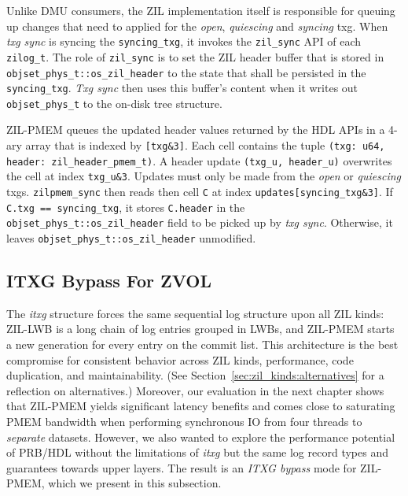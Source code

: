 \documentclass[12pt,a4paper,twoside]{book}
\begin{document}
{\begin{description}
        Unlike DMU consumers, the ZIL implementation itself is responsible for queuing up changes that need to applied for the \textit{open}, \textit{quiescing} and \textit{syncing} txg.
        When \textit{txg sync} is syncing the \lstinline{syncing_txg}, it invokes the \lstinline{zil_sync} API of each \lstinline{zilog_t}.
        The role of \lstinline{zil_sync} is to set the ZIL header buffer that is stored in \lstinline{objset_phys_t::os_zil_header} to the state that shall be persisted in the \lstinline{syncing_txg}.
        \textit{Txg sync} then uses this buffer's content when it writes out \lstinline{objset_phys_t} to the on-disk tree structure.

        ZIL-PMEM queues the updated header values returned by the HDL APIs in a 4-ary array that is indexed by \lstinline{[txg&3]}.
        Each cell contains the tuple \lstinline{(txg: u64, header: zil_header_pmem_t)}.
        A header update \lstinline{(txg_u, header_u)} overwrites the cell at index \lstinline{txg_u&3}.
        Updates must only be made from the \textit{open} or \textit{quiescing} txgs.
        \lstinline{zilpmem_sync} then reads then cell \lstinline{C} at index \lstinline{updates[syncing_txg&3]}.
        If \lstinline{C.txg == syncing_txg}, it stores \lstinline{C.header} in the \lstinline{objset_phys_t::os_zil_header} field to be picked up by \textit{txg sync}.
        Otherwise, it leaves \lstinline{objset_phys_t::os_zil_header} unmodified.

\end{description}

\subsection{ITXG Bypass For ZVOL}\label{sec:itxgbypass}
The \textit{itxg} structure forces the same sequential log structure upon all ZIL kinds:
ZIL-LWB is a long chain of log entries grouped in LWBs, and ZIL-PMEM starts a new generation for every entry on the commit list.
This architecture is the best compromise for consistent behavior across ZIL kinds, performance, code duplication, and maintainability.
(See Section~\ref{sec:zil_kinds:alternatives} for a reflection on alternatives.)
Moreover, our evaluation in the next chapter shows that ZIL-PMEM yields significant latency benefits and comes close to saturating PMEM bandwidth when performing synchronous IO from four threads to \textit{separate} datasets.
However, we also wanted to explore the performance potential of PRB/HDL without the limitations of \textit{itxg} but the same log record types and guarantees towards upper layers.
The result is an \textit{ITXG bypass} mode for ZIL-PMEM, which we present in this subsection.

}
\end{document}
